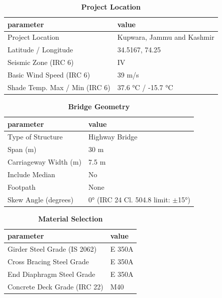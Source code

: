 \documentclass[12pt,a4paper]{report}
\numberwithin{table}{chapter}
\numberwithin{figure}{chapter}
\begin{document}
\begin{table}[H]
\caption{\textbf{Project Location}}
\label{subsec:project-location}
\begin{tabular}{|L{5.5cm}|L{8.5cm}|}
\hline
\textbf{parameter} & \textbf{value} \\
\hline
\textnormal{Project Location} & Kupwara, Jammu and Kashmir \\
\hline
\textnormal{Latitude / Longitude} & 34.5167, 74.25 \\
\hline
\textnormal{Seismic Zone (IRC 6)} & IV \\
\hline
\textnormal{Basic Wind Speed (IRC 6)} & 39 m/s \\
\hline
\textnormal{Shade Temp. Max / Min (IRC 6)} & 37.6 °C / -15.7 °C \\
\hline
\end{tabular}
\vspace{0.4cm}
\end{table}

\begin{table}[H]
\caption{\textbf{Bridge Geometry}}
\label{subsec:bridge-geometry}
\begin{tabular}{|L{5.5cm}|L{8.5cm}|}
\hline
\textbf{parameter} & \textbf{value} \\
\hline
\textnormal{Type of Structure} & Highway Bridge \\
\hline
\textnormal{Span (m)} & 30 m \\
\hline
\textnormal{Carriageway Width (m)} & 7.5 m \\
\hline
\textnormal{Include Median} & No \\
\hline
\textnormal{Footpath} & None \\
\hline
\textnormal{Skew Angle (degrees)} & 0° (IRC 24 Cl. 504.8 limit: $\pm$15°) \\
\hline
\end{tabular}
\end{table}
\vspace{0.4cm}

\begin{table}[H]
\caption{\textbf{Material Selection}}
\label{subsec:material}
\begin{tabular}{|L{5.5cm}|L{8.5cm}|}
\hline
\textbf{parameter} & \textbf{value} \\
\hline
\textnormal{Girder Steel Grade (IS 2062)} & E 350A \\
\hline
\textnormal{Cross Bracing Steel Grade} & E 350A \\
\hline
\textnormal{End Diaphragm Steel Grade} & E 350A \\
\hline
\textnormal{Concrete Deck Grade (IRC 22)} & M40 \\
\hline
\end{tabular}
\end{table}
\vspace{0.4cm}
\end{document}
